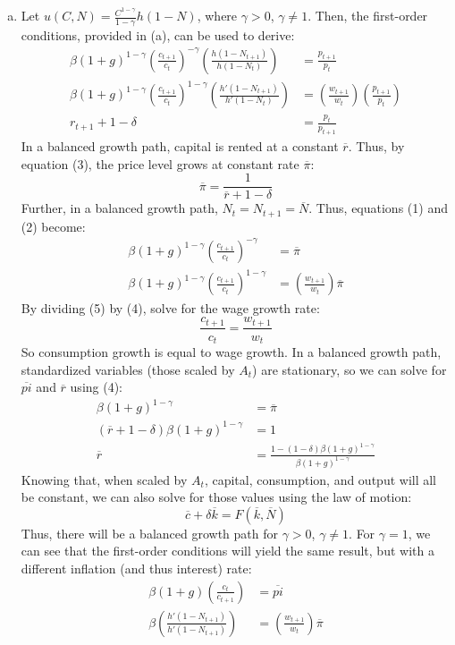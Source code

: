 \documentclass{article}
\begin{document}
\begin{enumerate}[(a)]
	\item Let $u(C,N) = \frac{C^{1-\gamma}}{1-\gamma}h(1-N)$, where $\gamma>0$, $\gamma\neq 1$. Then, the first-order conditions, provided in (a), can be used to derive:
		\begin{align}
			\beta(1+g)^{1-\gamma}\left(\frac{c_{t+1}}{c_t}\right)^{-\gamma}\left(\frac{h(1-N_{t+1})}{h(1-N_t)}\right) &= \frac{p_{t+1}}{p_t}	\\
			\beta(1+g)^{1-\gamma}\left(\frac{c_{t+1}}{c_t}\right)^{1-\gamma}\left(\frac{h'(1-N_{t+1})}{h'(1-N_t)}\right) &= \left(\frac{w_{t+1}}{w_t}\right)\left(\frac{p_{t+1}}{p_t}\right)	\\
			r_{t+1} + 1 - \delta &= \frac{p_t}{p_{t+1}}
		\end{align}
		In a balanced growth path, capital is rented at a constant $\overline{r}$. Thus, by equation (3), the price level grows at constant rate $\overline{\pi}$:
			\[
				\overline{\pi} = \frac{1}{\overline{r} + 1 - \delta}
			\]
		Further, in a balanced growth path, ${N_t=N_{t+1}=\overline{N}}$. Thus, equations (1) and (2) become:
		\begin{align}
			\beta(1+g)^{1-\gamma}\left(\frac{c_{t+1}}{c_t}\right)^{-\gamma} &= \overline{\pi}	\\
			\beta(1+g)^{1-\gamma}\left(\frac{c_{t+1}}{c_t}\right)^{1-\gamma} &= \left(\frac{w_{t+1}}{w_t}\right)\overline{\pi}
		\end{align}
		By dividing (5) by (4), solve for the wage growth rate:
		\[
			\frac{c_{t+1}}{c_t} = \frac{w_{t+1}}{w_t}
		\]
		So consumption growth is equal to wage growth. In a balanced growth path, standardized variables (those scaled by $A_t$) are stationary, so we can solve for $\overline{pi}$ and $\overline{r}$ using (4):
		\begin{align*}
			\beta(1+g)^{1-\gamma} &= \overline{\pi}	\\
			(\overline{r} + 1 - \delta)\beta(1+g)^{1-\gamma} &= 1	\\
			\overline{r} &= \frac{1 - (1-\delta)\beta(1+g)^{1-\gamma}}{\beta(1+g)^{1-\gamma}}
		\end{align*}
		Knowing that, when scaled by $A_t$, capital, consumption, and output will all be constant, we can also solve for those values using the law of motion:
		\[
			\overline{c} + \delta\overline{k} = F(\overline{k},\overline{N})
		\]
		Thus, there will be a balanced growth path for $\gamma >0$, $\gamma\neq 1$. For $\gamma=1$, we can see that the first-order conditions will yield the same result, but with a different inflation (and thus interest) rate:
		\begin{align*}
			\beta(1+g)\left(\frac{c_t}{c_{t+1}}\right) &= \overline{pi}	\\
			\beta\left(\frac{h'(1-N_{t+1})}{h'(1-N_{t+1})}\right) &= \left(\frac{w_{t+1}}{w_t}\right)\overline{\pi}
		\end{align*}
		

\end{enumerate}
\end{document}
